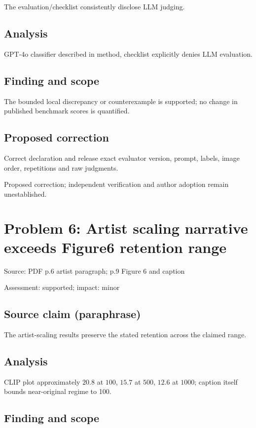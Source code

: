 \documentclass[11pt]{article}
\begin{document}
The evaluation/checklist consistently disclose LLM judging.

\subsection*{Analysis}

GPT-4o classifier described in method, checklist explicitly denies LLM evaluation.

\subsection*{Finding and scope}

The bounded local discrepancy or counterexample is supported; no change in published benchmark scores is quantified.

\subsection*{Proposed correction}

Correct declaration and release exact evaluator version, prompt, labels, image order, repetitions and raw judgments.

Proposed correction; independent verification and author adoption remain unestablished.

\section*{Problem 6: Artist scaling narrative exceeds Figure6 retention range}

Source: PDF p.6 artist paragraph; p.9 Figure 6 and caption

Assessment: supported; impact: minor

\subsection*{Source claim (paraphrase)}

The artist-scaling results preserve the stated retention across the claimed range.

\subsection*{Analysis}

CLIP plot approximately \(20.8\) at \(100\), \(15.7\) at \(500\), \(12.6\) at \(1000\); caption itself bounds near-original regime to 100.

\subsection*{Finding and scope}
\end{document}
